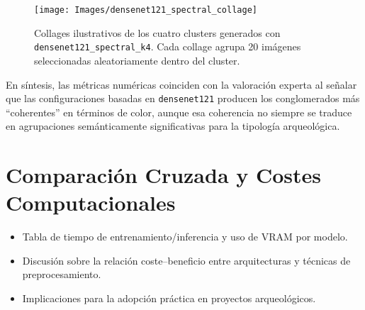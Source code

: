 \begin{figure}[!h]
  \centering
  \texttt{[image: Images/densenet121\_spectral\_collage]}
  \caption{Collages ilustrativos de los cuatro clusters generados con \texttt{densenet121\_spectral\_k4}.
  Cada collage agrupa 20 imágenes seleccionadas aleatoriamente dentro del cluster.}
  \label{fig:cluster_collages}
\end{figure}

En síntesis, las métricas numéricas coinciden con la valoración experta al señalar que las configuraciones basadas en \texttt{densenet121} producen los conglomerados más “coherentes” en términos de color, aunque esa coherencia no siempre se traduce en agrupaciones semánticamente significativas para la tipología arqueológica.

\section{Comparación Cruzada y Costes Computacionales}

\begin{itemize}
  \item Tabla de tiempo de entrenamiento/inferencia y uso de VRAM por modelo.
  \item Discusión sobre la relación coste–beneficio entre arquitecturas y técnicas de preprocesamiento.
  \item Implicaciones para la adopción práctica en proyectos arqueológicos.
\end{itemize}
